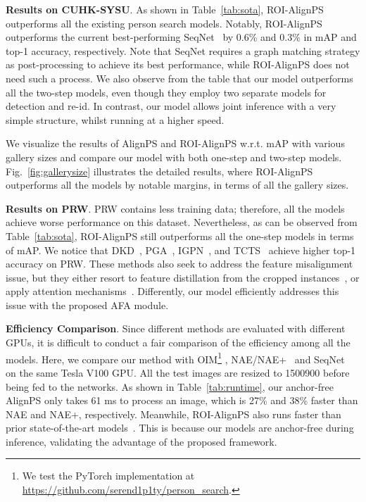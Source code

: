 \documentclass[journal]{IEEEtran}
\begin{document}
\textbf{Results on CUHK-SYSU}.
As shown in Table~\ref{tab:sota}, ROI-AlignPS outperforms all the existing person search models. Notably, ROI-AlignPS outperforms the current best-performing SeqNet~\cite{DBLP:conf/aaai/LiM21} by 0.6\% and 0.3\% in mAP and top-1 accuracy, respectively. Note that SeqNet requires a graph matching strategy as post-processing to achieve its best performance, while ROI-AlignPS does not need such a process.
We also observe from the table that our model outperforms all the two-step models, even though they employ two separate models for detection and re-id. In contrast, our model allows joint inference with a very simple structure, whilst running at a higher speed. 

We visualize the results of AlignPS and ROI-AlignPS w.r.t. mAP with various gallery sizes and compare our model with both one-step and two-step models. Fig.~\ref{fig:gallerysize} illustrates the detailed results, where ROI-AlignPS outperforms all the models by notable margins, in terms of all the gallery sizes.


\textbf{Results on PRW}.
PRW contains less training data; therefore, all the models achieve worse performance on this dataset. Nevertheless, as can be observed from Table~\ref{tab:sota}, ROI-AlignPS still outperforms all the one-step models in terms of mAP. We notice that DKD~\cite{DBLP:conf/aaai/ZhangWBSY21}, PGA~\cite{Kim_2021_CVPR}, IGPN~\cite{DBLP:conf/cvpr/DongZST20}, and TCTS~\cite{DBLP:conf/cvpr/WangMCSC20} achieve higher top-1 accuracy on PRW. These methods also seek to address the feature misalignment issue, but they either resort to feature distillation from the cropped instances~\cite{DBLP:conf/aaai/ZhangWBSY21,DBLP:conf/cvpr/DongZST20,DBLP:conf/cvpr/WangMCSC20}, or apply attention mechanisms~\cite{Kim_2021_CVPR}. Differently, our model efficiently addresses this issue with the proposed AFA module.


\textbf{Efficiency Comparison}.
Since different methods are evaluated with different GPUs, it is difficult to conduct a fair comparison of the efficiency among all the models. Here, we compare our method with OIM\footnote{We test the PyTorch implementation at \url{https://github.com/serend1p1ty/person_search}.} \cite{DBLP:conf/cvpr/XiaoLWLW17}, NAE/NAE+~\cite{DBLP:conf/cvpr/ChenZYS20} and SeqNet~\cite{DBLP:conf/aaai/LiM21} on the same Tesla V100 GPU. All the test images are resized to 1500900 before being fed to the networks. As shown in Table~\ref{tab:runtime}, our anchor-free AlignPS only takes 61 ms to process an image, which is 27\% and 38\% faster than NAE and NAE+, respectively. Meanwhile, ROI-AlignPS also runs faster than prior state-of-the-art models~\cite{DBLP:conf/cvpr/ChenZYS20,DBLP:conf/aaai/LiM21}. This is because our models are anchor-free during inference, validating the advantage of the proposed framework.
\end{document}
